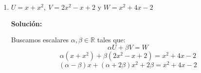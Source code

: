 \documentclass[12pt]{article}
\newcommand{\solucion}{%
    \vspace{0.8em}%
    \textbf{Solución:}%
    \vspace{0.8em}%
}
\begin{document}
\begin{enumerate}[label=\alph*.-]
    Buscamos escalares $\alpha,\beta \in \mathbb{R}$ tales que:
    \[
    \alpha U + \beta V = W
    \]
    \[
    \alpha\begin{pmatrix} 1 & -1 \\ 0 & 2 \end{pmatrix} + \beta\begin{pmatrix} 0 & 1 \\ 2 & 1 \end{pmatrix} = \begin{pmatrix} 2 & -1 \\ 2 & 1 \end{pmatrix}
    \]
    \[
    \begin{pmatrix} \alpha & -\alpha+\beta \\ 2\beta & 2\alpha+\beta \end{pmatrix} = \begin{pmatrix} 2 & -1 \\ 2 & 1 \end{pmatrix}
    \]

    Igualando entrada por entrada, obtenemos el sistema:
    \[
    \begin{cases}
    \alpha = 2 \\
    -\alpha+\beta = -1 \\
    2\beta = 2 \\
    2\alpha+\beta = 1
    \end{cases}
    \]

    De la primera ecuación: $\alpha=2$.

    Sustituyendo en la segunda: $-2+\beta=-1 \Rightarrow \beta=1$.

    Verificamos en la tercera: $2(1)=2$ \checkmark

    Verificamos en la cuarta: $2(2)+1 = 5 \neq 1$ (no se cumple).

    Como la cuarta ecuación no se satisface con los valores hallados, el sistema es \textbf{incompatible} (no tiene solución).

    \textbf{Conclusión:} $W$ \textbf{no es combinación lineal} de $U$ y $V$.

    \item $U = x + x^2,\ V = 2x^2 - x + 2$ y $W = x^2 + 4x - 2$

    \solucion

    Buscamos escalares $\alpha,\beta \in \mathbb{R}$ tales que:
    \[
    \alpha U + \beta V = W
    \]
    \[
    \alpha(x+x^2) + \beta(2x^2-x+2) = x^2+4x-2
    \]
    \[
    (\alpha-\beta)x + (\alpha+2\beta)x^2 + 2\beta = x^2+4x-2
    \]


\end{enumerate}
\end{document}
